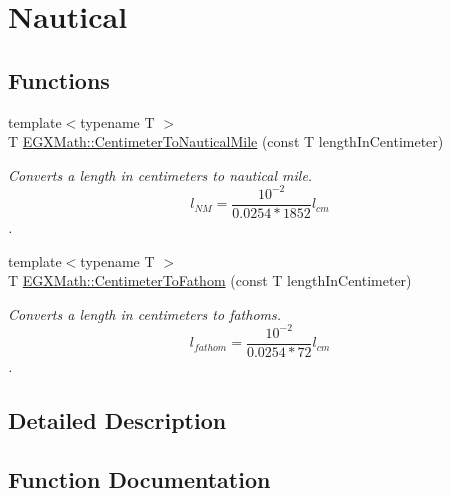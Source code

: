 \hypertarget{group___e_g_x_math-_conversions-_length_conversions-_centimeter-_nautical}{}\section{Nautical}
\label{group___e_g_x_math-_conversions-_length_conversions-_centimeter-_nautical}
\subsection*{Functions}
\begin{DoxyCompactItemize}
\item 
{\footnotesize template$<$typename T $>$ }\\T \mbox{\hyperlink{group___e_g_x_math-_conversions-_length_conversions-_centimeter-_nautical_ga65cf4453e28b375ee5c52389620939c6}{E\+G\+X\+Math\+::\+Centimeter\+To\+Nautical\+Mile}} (const T length\+In\+Centimeter)
\begin{DoxyCompactList}\small\item\em Converts a length in centimeters to nautical mile. \[ l_{NM}= \frac{10^{-2}}{0.0254 * 1852} l_{cm} \]. \end{DoxyCompactList}\item 
{\footnotesize template$<$typename T $>$ }\\T \mbox{\hyperlink{group___e_g_x_math-_conversions-_length_conversions-_centimeter-_nautical_ga9a46ae39f9cc70947d27a297c1c3f113}{E\+G\+X\+Math\+::\+Centimeter\+To\+Fathom}} (const T length\+In\+Centimeter)
\begin{DoxyCompactList}\small\item\em Converts a length in centimeters to fathoms. \[ l_{fathom}= \frac{10^{-2}}{0.0254 * 72} l_{cm} \]. \end{DoxyCompactList}\end{DoxyCompactItemize}


\subsection{Detailed Description}


\subsection{Function Documentation}
\mbox{\label{group___e_g_x_math-_conversions-_length_conversions-_centimeter-_nautical_ga9a46ae39f9cc70947d27a297c1c3f113}} 
